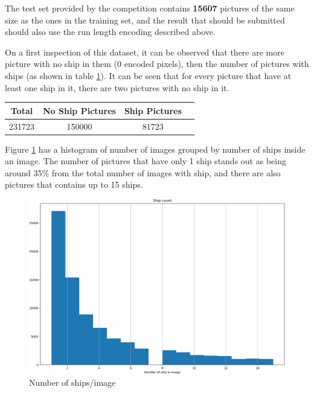 The test set provided by the competition contains \textbf{15607} pictures of the same size as the ones in the training set, and the result that should be submitted should also use the run length encoding described above.


On a first inspection of this dataset, it can be observed that there are more picture with no ship in them (0 encoded pixels), then the number of pictures with ships (as shown in table \ref{shipnoshiptable}). It can be seen that for every picture that have at least one ship in it, there are two pictures with no ship in it.

\begin{table}[H]
	\centering
	\begin{tabular}{|c|c|c|l|}
		\hline
		Total & No Ship Pictures & Ship Pictures \\ \hline
		231723 & 150000 & 81723 \\ \hline
	\end{tabular}
	\label{shipnoshiptable}
\end{table}

Figure \ref{ShipNumberImage} has a histogram of number of images grouped by number of ships inside an image. The number of pictures that have only 1 ship stands out as being around 35\% from the total number of images with ship, and there are also pictures that contains up to 15 ships.

\begin{figure}
	\includegraphics[width=\textwidth]{Pictures/001ShipNumberImage.png}
	\caption{ Number of ships/image}
	\label{ShipNumberImage}
\end{figure}

